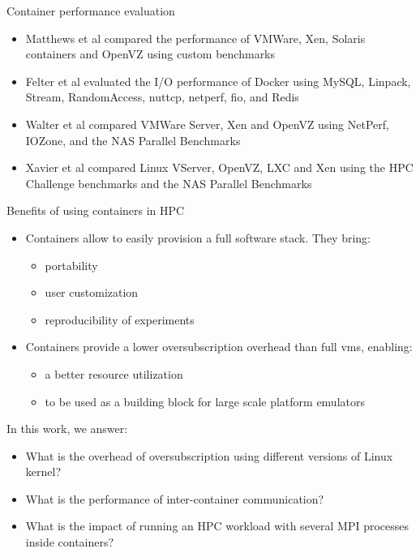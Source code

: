 \documentclass[presentation]{beamer}
\begin{document}
\begin{frame}[label=sec-2-2]{Container performance evaluation}
\begin{itemize}
\item Matthews et al\cite{matthews2007quantifying} compared the performance of VMWare,
Xen, Solaris containers and OpenVZ using custom benchmarks
\item Felter et al\cite{ibmtrdocker} evaluated the I/O performance of Docker using MySQL,
Linpack, Stream, RandomAccess, nuttcp, netperf, fio, and Redis
\item Walter et al\cite{4482796} compared VMWare Server, Xen and
OpenVZ using NetPerf, IOZone, and the NAS Parallel Benchmarks

\item Xavier et al\cite{6498558} compared Linux VServer, OpenVZ,
LXC and Xen using the HPC Challenge benchmarks and the NAS
Parallel Benchmarks
\end{itemize}
\end{frame}

\begin{frame}[label=sec-2-3]{Benefits of using containers in HPC}
\begin{itemize}
\item Containers allow to easily provision a full software stack.
They bring:
\begin{itemize}
\item portability
\item user customization
\item reproducibility of experiments
\end{itemize}

\item Containers provide a lower oversubscription overhead than full vms, enabling:
\begin{itemize}
\item a better resource utilization
\item to be used as a building block for large scale platform emulators
\end{itemize}
\end{itemize}
\end{frame}

{
\begin{frame}[label=sec-2-4]{In this work, we answer:}



\begin{itemize}
\item What is the overhead of oversubscription using different versions of Linux kernel?
\item What is the performance of inter-container communication?
\item What is the impact of running an HPC workload with several MPI processes inside containers?
\end{itemize}
\end{frame}
}
\end{document}
